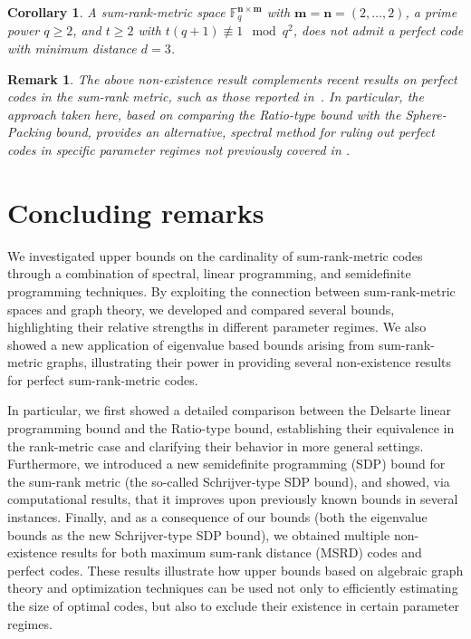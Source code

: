 \documentclass[a4paper]{article}
\newtheorem{corollary}[formula]{Corollary}
\newtheorem{remark}[formula]{Remark}
\newcommand{\F}{\mathbb{F}}
\newcommand{\bfn}{\mathbf {n}}
\newcommand{\bfm}{\mathbf {m}}
\newcommand{\spac}{\F^{\bfn\times\bfm}_q}
\begin{document}
\begin{corollary}
    A sum-rank-metric space $\spac$ with $\bfm=\bfn=(2,\dots,2)$, a prime power $q\geq2$, and $t\geq2$ with $t(q+1)\not\equiv 1\mod q^2$, does not admit a perfect code with minimum distance $d=3$.
\end{corollary}

\begin{remark}
The above non-existence result complements recent results on perfect codes in the sum-rank metric, such as those reported in~\cite[Proposition 5.1 and Theorems 6.2 and 6.3]{PRZ2025}. In particular, the approach taken here, based on comparing the Ratio-type bound with the Sphere-Packing bound, provides an alternative, spectral method for ruling out perfect codes in specific parameter regimes not previously covered in \cite{PRZ2025}. 
\end{remark}




\section{Concluding remarks}\label{sec:concludingremarks}
We investigated upper bounds on the cardinality of sum-rank-metric codes through a combination of spectral, linear programming, and semidefinite programming techniques. By exploiting the connection between sum-rank-metric spaces and graph theory, we developed and compared several bounds, highlighting their relative strengths in different parameter regimes.
We also showed a new application of eigenvalue based bounds arising from sum-rank-metric graphs, illustrating their power in providing several non-existence results for perfect sum-rank-metric codes. 

 
In particular, we first showed a detailed comparison between the Delsarte linear programming bound and the Ratio-type bound, establishing their equivalence in the rank-metric case and clarifying their behavior in more general settings. Furthermore, we introduced a new semidefinite programming (SDP) bound for the sum-rank metric (the so-called Schrijver-type SDP bound), and showed, via computational results, that it improves upon previously known bounds in several instances. Finally, and as a consequence of our bounds (both the eigenvalue bounds as the new Schrijver-type SDP bound), we obtained multiple non-existence results for both maximum sum-rank distance (MSRD) codes and perfect codes. These results illustrate how upper bounds based on algebraic graph theory and optimization techniques can be used not only to efficiently estimating the size of optimal codes, but also to exclude their existence in certain parameter regimes.
\end{document}
